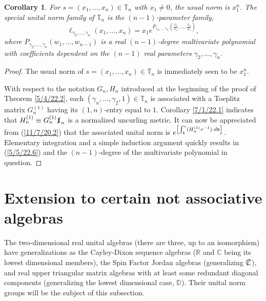 \documentclass{amsart}
\newtheorem{corollary}[theorem]{Corollary}
\theoremstyle{definition}
\numberwithin{theorem}{section}
\numberwithin{equation}{section}
\begin{document}
\begin{corollary}\label{5/17/22.1} For $s= (x_1,\dots,x_n)\in \mathbb{T}_n$ with $x_1\ne 0$, the usual norm is $x_1^n$.  The special unital norm family of $\mathbb{T}_n$ is the $(n-1)$-parameter family,
\begin{equation} \label{5/5/22.6} \ell_{\gamma_2,\dots,\gamma_n}(x_1,\dots,x_n) = x_1 e^{P_{\gamma_2,\dots,\gamma_n}\left(\frac{x_2}{x_1},\dots,\frac{x_n}{x_1}\right)},\end{equation} where $P_{\gamma_2,\dots,\gamma_n}(w_1,\dots,w_{n-1})$ is a real $(n-1)$-degree multivariate polynomial with coefficients dependent on the $(n-1)$ real parameters $\gamma_2,\dots,\gamma_n$.    \end{corollary}

\begin{proof} The usual norm of $s=(x_1,\dots,x_n)\in \mathbb{T}_n$ is immediately seen to be $x_1^n$.

With respect to the notation $G_n,H_n$ introduced at the beginning of the proof of Theorem \ref{5/4/22.2}, each $(\gamma_n,\dots,\gamma_2,1)\in\mathbb{T}_n$ is associated with a Toeplitz matrix $G_n^{(1)}$ having its $(1,n)$-entry equal to $1$.  Corollary \ref{7/1/22.1} indicates that $H^{(1)}_n\equiv G_n^{(1)}\slashed{\bf 1}_n$ is a normalized uncurling metric. It can now be appreciated from (\ref{11/7/20.2}) that  the associated unital norm is $e^{\left[\int_{\bf 1}^s (H_n^{(1)} v^{-1})\cdot d\mathfrak{v}\right]}$.  Elementary integration and a simple induction argument quickly results in (\ref{5/5/22.6}) and the $(n-1)$-degree of the multivariate polynomial in question.
\end{proof}

  \section{Extension to certain not associative algebras}
The two-dimensional real unital algebras (there are three, up to an isomorphism) have generalizations as the Cayley-Dixon sequence algebras ($\mathbb{R}$ and $\mathbb{C}$ being its lowest dimensional members),  the Spin Factor Jordan algebras (generalizing $\slashed{\mathbb{C}}$), and real upper triangular matrix algebras with at least some redundant diagonal components (generalizing the lowest dimensional case, $\mathbb{D}$).  Their unital norm groups will be the subject of this subsection. 
\end{document}
